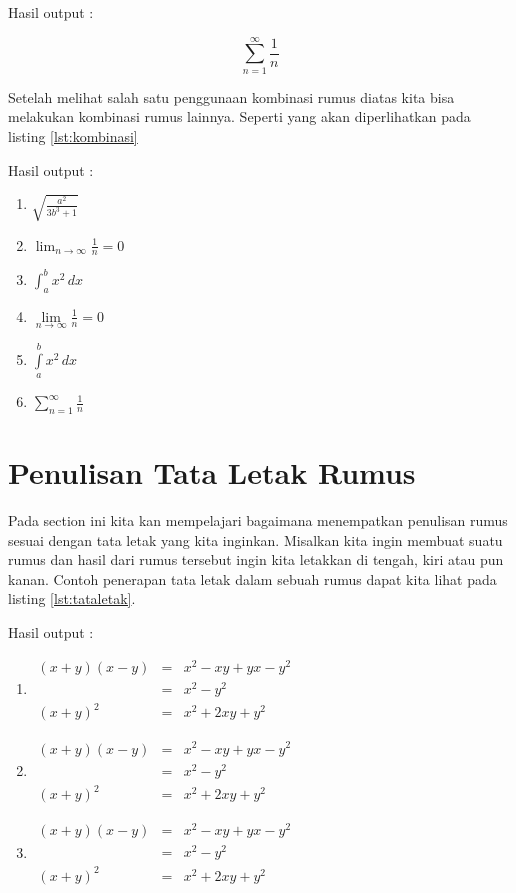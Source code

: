 Hasil output :

$$\sum^{\infty}_{n=1} \frac{1}{n}$$

Setelah melihat salah satu penggunaan kombinasi rumus diatas kita bisa melakukan kombinasi rumus lainnya. Seperti yang akan diperlihatkan pada listing \ref{lst:kombinasi}



Hasil output :
\begin{enumerate}
\item $\sqrt{ \frac{a^2}{3b^3+1}}$
\item $\lim_{n \to \infty} \frac{1}{n}=0$
\item $\int^b_a x^2 \, dx$
\item $\lim \limits_{n \to \infty} \frac{1}{n}=0$
\item $\int \limits^b_a x^2 \, dx$
\item $\sum \limits^{\infty}_{n=1} \frac{1}{n}$
\end{enumerate}

\section{Penulisan Tata Letak Rumus}
Pada section ini kita kan mempelajari bagaimana menempatkan penulisan rumus sesuai dengan tata letak yang kita inginkan. Misalkan kita ingin membuat suatu rumus dan hasil dari rumus tersebut ingin kita letakkan di tengah, kiri atau pun kanan. Contoh penerapan tata letak dalam sebuah rumus dapat kita lihat pada listing \ref{lst:tataletak}.


Hasil output :
\begin{enumerate}
\item $\begin{array}{ccc} (x+y)(x-y) & = & x^2-xy + yx-y^2 \\ & = & x^2-y^2 \\ (x+y)^2 & = & x^2 + 2xy + y^2 \end{array}$

\item $\begin{array}{lcr} (x+y)(x-y) & = & x^2-xy + yx-y^2 \\ & = & x^2-y^2 \\ (x+y)^2 & = & x^2 + 2xy + y^2 \end{array}$

\item $\begin{array}{rcl} (x+y)(x-y) & = & x^2-xy + yx-y^2 \\ & = & x^2-y^2 \\ (x+y)^2 & = & x^2 + 2xy + y^2 \end{array}$
\end{enumerate}

